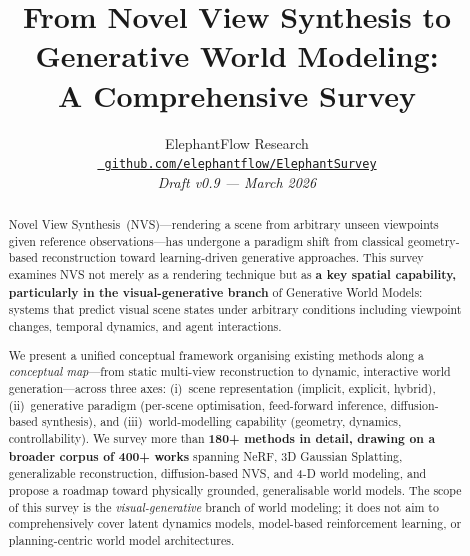 \documentclass{article}
\title{%
  From Novel View Synthesis to Generative World Modeling:\\
  A Comprehensive Survey%
}
\author{%
  ElephantFlow Research \\
  \texttt{\href{https://github.com/elephantflow/ElephantSurvey}{%
    github.com/elephantflow/ElephantSurvey}} \\[2pt]
  \textit{Draft v0.9 — March 2026}
}
\newcommand{\nvs}{NVS}
\begin{document}
\maketitle

\begin{abstract}
Novel View Synthesis~(\nvs)---rendering a scene from arbitrary unseen viewpoints
given reference observations---has undergone a paradigm shift from classical
geometry-based reconstruction toward learning-driven generative approaches.
This survey examines \nvs{} not merely as a rendering technique but as
\textbf{a key spatial capability, particularly in the visual-generative branch}
of Generative World Models:
systems that predict visual scene states under arbitrary conditions including
viewpoint changes, temporal dynamics, and agent interactions.

We present a unified conceptual framework organising existing methods along a
\emph{conceptual map}---from static multi-view reconstruction to dynamic,
interactive world generation---across three axes:
(i)~scene representation (implicit, explicit, hybrid),
(ii)~generative paradigm (per-scene optimisation, feed-forward inference,
diffusion-based synthesis),
and (iii)~world-modelling capability (geometry, dynamics, controllability).
We survey more than \textbf{180+ methods in detail, drawing on a broader corpus of 400+ works} spanning NeRF,
3D Gaussian Splatting, generalizable reconstruction, diffusion-based NVS,
and 4-D world modeling, and propose a roadmap toward physically grounded,
generalisable world models.
The scope of this survey is the \emph{visual-generative} branch of world modeling; it does not aim to comprehensively cover latent dynamics models, model-based reinforcement learning, or planning-centric world model architectures.
\end{abstract}
























\end{document}
